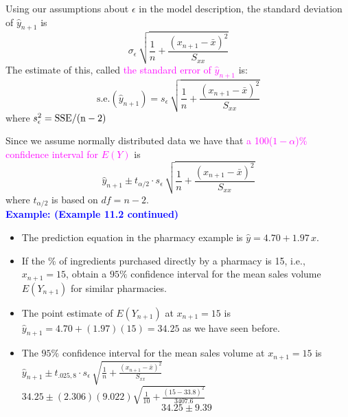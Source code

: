 \documentclass[xcolor=dvipsnames,12pt]{beamer}
\begin{document}
\begin{frame}
 Using our assumptions about $\epsilon$ in the model description,
the standard deviation of $ \hat{y}_{n+1}$ is  
$$
  \sigma_\epsilon\,\sqrt{  \frac1n +
    \frac{(x_{n+1} - \bar{x})^2}{S_{xx}}}
$$
The estimate of this, called \textcolor{magenta}{the standard error of  $ \hat{y}_{n+1}$} is:
$$
  \mbox{s.e.}( \hat{y}_{n+1})  = s_\epsilon\,\sqrt{  \frac1n +
    \frac{(x_{n+1} - \bar{x})^2}{S_{xx}}}
$$
where $  s_\epsilon^2 = \rm{SSE}/(n-2)$
\end{frame}




\begin{frame}
 Since we assume  normally distributed data we have that \textcolor{magenta}{a
100($1-\alpha$)\% confidence interval for $E(Y)$} is
$$
   \hat{y}_{n+1}  \pm t_{\alpha/2}\cdot s_\epsilon\,
  \sqrt{\frac1n + \frac{(x_{n+1}-\bar{x})^2}{S_{xx}}}
$$
where $t_{\alpha/2}$ is based on $df = n-2$. \\[.2in]
 \textbf{\textcolor{blue}{Example: (Example 11.2 continued)}}\\[.1in]
\begin{itemize}
\item The prediction equation in the pharmacy example 
is $\hat{y}=4.70 +1.97\,x$.\\[.1in]
\item If the \% of ingredients purchased directly by a pharmacy is
15, i.e., $x_{n+1}=15$, obtain a $95\%$ confidence interval 
for the mean sales volume $E(Y_{n+1})$ for similar pharmacies.\\[.1in]
\end{itemize}
\end{frame}





\begin{frame}
\begin{itemize}
\item The point estimate of  $E(Y_{n+1})$ at  $x_{n+1}=15$ is
$ \hat{y}_{n+1}=4.70 +(1.97)(15)=34.25$
as we have seen before.\\[.1in]
\item The $95\%$ confidence interval for the mean sales volume at
$x_{n+1}=15$ is\\
$\hat{y}_{n+1} \pm t_{.025,8} \cdot s_{\epsilon}\, \sqrt{\frac{1}{n} +
\frac{(x_{n+1}-\bar{x})^2}{S_{xx}}}$\\
$34.25\pm (2.306)(9.022)\sqrt{\frac{1}{10} +
\frac{(15-33.8)^2}{3407.6}}$\\
$$ 34.25\pm 9.39$$
\end{itemize}
\end{frame}
\end{document}
